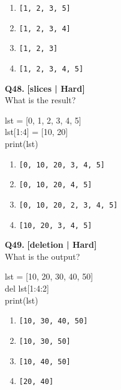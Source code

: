 \begin{enumerate}[label=(\alph*),topsep=2pt,itemsep=1pt,partopsep=0pt,parsep=0pt]
    \item \relax \texttt{[1, 2, 3, 5]}
    \item \relax \texttt{[1, 2, 3, 4]}
    \item \relax \texttt{[1, 2, 3]}
    \item \relax \texttt{[1, 2, 3, 4, 5]}
\end{enumerate}
\vspace{2mm}

\noindent\textbf{Q48.} \hfill {\small\color{LPUOrange}\textbf{[slices | Hard]}}\\[2pt]
What is the result? 

\begin{pycode}
lst = [0, 1, 2, 3, 4, 5]\\
lst[1:4] = [10, 20]\\
print(lst)
\end{pycode}

\begin{enumerate}[label=(\alph*),topsep=2pt,itemsep=1pt,partopsep=0pt,parsep=0pt]
    \item \relax \texttt{[0, 10, 20, 3, 4, 5]}
    \item \relax \texttt{[0, 10, 20, 4, 5]}
    \item \relax \texttt{[0, 10, 20, 2, 3, 4, 5]}
    \item \relax \texttt{[10, 20, 3, 4, 5]}
\end{enumerate}
\vspace{2mm}

\noindent\textbf{Q49.} \hfill {\small\color{LPUOrange}\textbf{[deletion | Hard]}}\\[2pt]
What is the output? 

\begin{pycode}
lst = [10, 20, 30, 40, 50]\\
del lst[1:4:2]\\
print(lst)
\end{pycode}

\begin{enumerate}[label=(\alph*),topsep=2pt,itemsep=1pt,partopsep=0pt,parsep=0pt]
    \item \relax \texttt{[10, 30, 40, 50]}
    \item \relax \texttt{[10, 30, 50]}
    \item \relax \texttt{[10, 40, 50]}
    \item \relax \texttt{[20, 40]}
\end{enumerate}
\vspace{2mm}

